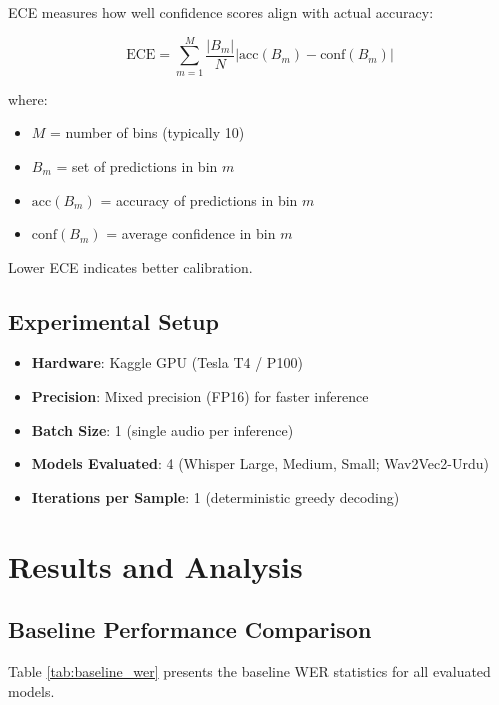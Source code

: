 ECE measures how well confidence scores align with actual accuracy:

\begin{equation}
\text{ECE} = \sum_{m=1}^{M} \frac{|B_m|}{N} \left| \text{acc}(B_m) - \text{conf}(B_m) \right|
\end{equation}

where:
\begin{itemize}
    \item $M$ = number of bins (typically 10)
    \item $B_m$ = set of predictions in bin $m$
    \item $\text{acc}(B_m)$ = accuracy of predictions in bin $m$
    \item $\text{conf}(B_m)$ = average confidence in bin $m$
\end{itemize}

Lower ECE indicates better calibration.

\subsection{Experimental Setup}

\begin{itemize}
    \item \textbf{Hardware}: Kaggle GPU (Tesla T4 / P100)
    \item \textbf{Precision}: Mixed precision (FP16) for faster inference
    \item \textbf{Batch Size}: 1 (single audio per inference)
    \item \textbf{Models Evaluated}: 4 (Whisper Large, Medium, Small; Wav2Vec2-Urdu)
    \item \textbf{Iterations per Sample}: 1 (deterministic greedy decoding)
\end{itemize}

\section{Results and Analysis}

\subsection{Baseline Performance Comparison}

Table \ref{tab:baseline_wer} presents the baseline WER statistics for all evaluated models.

